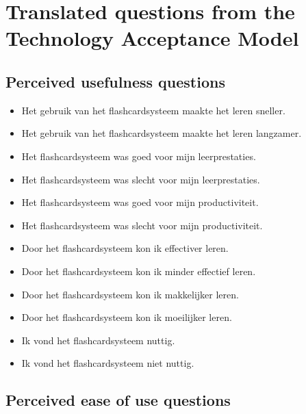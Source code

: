 \section{Translated questions from the Technology Acceptance Model}
\label{sec:tamquestions}

\subsection{Perceived usefulness
questions}\label{perceived-usefulness-questions}

\begin{itemize}
\itemsep1pt\parskip0pt
\item
  Het gebruik van het flashcardsysteem maakte het leren sneller.
\item
  Het gebruik van het flashcardsysteem maakte het leren langzamer.
\item
  Het flashcardsysteem was goed voor mijn leerprestaties.
\item
  Het flashcardsysteem was slecht voor mijn leerprestaties.
\item
  Het flashcardsysteem was goed voor mijn productiviteit.
\item
  Het flashcardsysteem was slecht voor mijn productiviteit.
\item
  Door het flashcardsysteem kon ik effectiver leren.
\item
  Door het flashcardsysteem kon ik minder effectief leren.
\item
  Door het flashcardsysteem kon ik makkelijker leren.
\item
  Door het flashcardsysteem kon ik moeilijker leren.
\item
  Ik vond het flashcardsysteem nuttig.
\item
  Ik vond het flashcardsysteem niet nuttig.
\end{itemize}

\subsection{Perceived ease of use
questions}\label{perceived-ease-of-use-questions}

